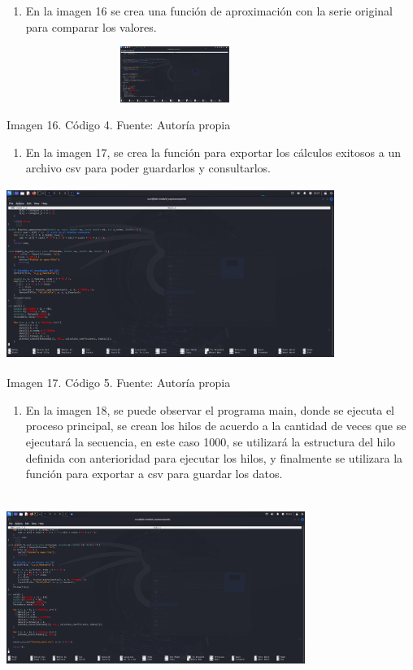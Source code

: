 \begin{enumerate} \def\labelenumi{\arabic{enumi}.} \setcounter{enumi}{3} \item   En la imagen 16 se crea una función de aproximación con la serie   original para comparar los valores. \end{enumerate}

\includegraphics[width=4.31145in,height=0.71292in]{media/image27.png}

Imagen 16. Código 4. Fuente: Autoría propia

\begin{enumerate} \def\labelenumi{\arabic{enumi}.} \setcounter{enumi}{4} \item   En la imagen 17, se crea la función para exportar los cálculos   exitosos a un archivo csv para poder guardarlos y consultarlos. \end{enumerate}

\includegraphics[width=4.19531in,height=2.2036in]{media/image27.png}

Imagen 17. Código 5. Fuente: Autoría propia

\begin{enumerate} \def\labelenumi{\arabic{enumi}.} \setcounter{enumi}{5} \item   En la imagen 18, se puede observar el programa main, donde se ejecuta   el proceso principal, se crean los hilos de acuerdo a la cantidad de   veces que se ejecutará la secuencia, en este caso 1000, se utilizará   la estructura del hilo definida con anterioridad para ejecutar los   hilos, y finalmente se utilizara la función para exportar a csv para   guardar los datos. \end{enumerate}

\includegraphics[width=3.82031in,height=2.4068in]{media/image5.png}

